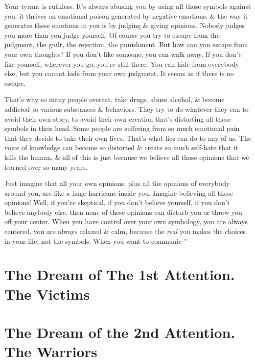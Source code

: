 \documentclass{article}
\numberwithin{equation}{section}
\begin{document}
Your tyrant is ruthless. It's always abusing you by using all those symbols against you. it thrives on emotional poison generated by negative emotions, \& the way it generates these emotions in you is by judging \& giving opinions. Nobody judges you more than you judge yourself. Of course you try to escape from the judgment, the guilt, the rejection, the punishment. But how can you escape from your own thoughts? If you don't like someone, you can walk away. If you don't like yourself, wherever you go, you're still there. You can hide from everybody else, but you cannot hide from your own judgment. It seems as if there is no escape.

That's why so many people overeat, take drugs, abuse alcohol, \& become addicted to various substances \& behaviors. They try to do whatever they can to avoid their own story, to avoid their own creation that's distorting all those symbols in their head. Some people are suffering from so much emotional pain that they decide to take their own lives. That's what lies can do to any of us. The voice of knowledge can become so distorted \& create so much self-hate that it kills the human. \& all of this is just because we believe all those opinions that we learned over so many years.

Just imagine that all your own opinions, plus all the opinions of everybody around you, are like a huge hurricane inside you. Imagine believing all those opinions! Well, if you're skeptical, if you don't believe yourself, if you don't believe anybody else, then none of these opinions can disturb you or throw you off your center. When you have control over your own symbology, you are always centered, you are always relaxed \& calm, because the \textit{real} you makes the choices in your life, not the symbols. When you want to communic
'' -- \cite[pp. 75--]{Ruiz_Ruiz2011}


\section{The Dream of The 1st Attention. The Victims}


\section{The Dream of the 2nd Attention. The Warriors}
\end{document}
